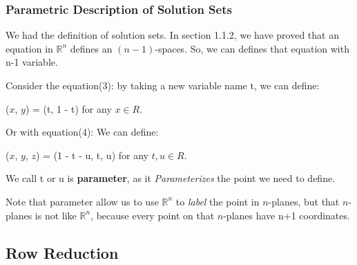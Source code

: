 \documentclass[a4paper,12pt]{article}
\begin{document}
\Large \subsubsection{Parametric Description of Solution Sets}
    \begin{frame}
        \small
        
        \small We had the definition of solution sets. In section 1.1.2, we have proved that an equation in \(\mathbb{R}^n\) defines an \((n-1)\)-spaces. So, we can defines that equation with n-1 variable.

        Consider the equation(3): by taking a new variable name t, we can define:
        \begin{center}
            (\(x\), \(y\)) = (t, 1 - t) for any $x \in R$.
        \end{center}

        Or with equation(4): We can define: 
        \begin{center}
            (\(x\), \(y\), \(z\)) = (1 - t - u, t, u) for any $t, u \in R$.
        \end{center}
        
        We call t or u is \textbf{parameter}, as it \textit{Parameterizes} the point we need to define.

        Note that parameter allow us to use \(\mathbb{R}^n\) to \textit{label} the point in \(n\)-planes, but that \(n\)-planes is not like \(\mathbb{R}^n\), because every point on that \(n\)-planes have n+1 coordinates.
    \end{frame}
\Large \subsection{Row Reduction}
\small
\end{document}

